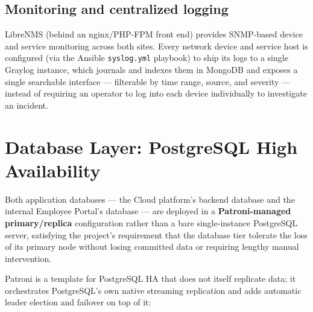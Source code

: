 \documentclass[11pt,a4paper]{report}
\begin{document}
\section{Monitoring and centralized logging}

LibreNMS (behind an nginx/PHP-FPM front end) provides SNMP-based device and
service monitoring across both sites. Every network device and service host
is configured (via the Ansible \texttt{syslog.yml} playbook) to ship its
logs to a single Graylog instance, which journals and indexes them in
MongoDB and exposes a single searchable interface --- filterable by time
range, source, and severity --- instead of requiring an operator to log
into each device individually to investigate an incident.

\chapter{Database Layer: PostgreSQL High Availability}
\label{ch:db}

Both application databases --- the Cloud platform's backend database and
the internal Employee Portal's database --- are deployed in a
\textbf{Patroni-managed primary/replica} configuration rather than a bare
single-instance PostgreSQL server, satisfying the project's requirement
that the database tier tolerate the loss of its primary node without losing
committed data or requiring lengthy manual intervention.

Patroni is a template for PostgreSQL HA that does not itself replicate
data; it orchestrates PostgreSQL's own native streaming replication and
adds automatic leader election and failover on top of it:
\end{document}
